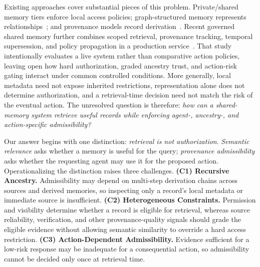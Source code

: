 \documentclass[letterpaper]{article} %
\begin{document}
Existing approaches cover substantial pieces of this problem. Private/shared memory tiers enforce local access policies; graph-structured memory represents relationships~\cite{edge2024graphrag,guo2025lightrag,gutierrez2024hipporag}; and provenance models record  derivation~\cite{belhajjame2013provdm,moreau2013prov}. Recent governed shared memory further combines scoped retrieval, provenance tracking, temporal supersession, and policy propagation in a production service~\cite{margalit2026governed}. That study intentionally evaluates a live system rather than comparative action policies, leaving open how hard authorization, graded ancestry trust, and action-risk gating interact under common controlled conditions. More generally, local metadata need not expose inherited restrictions, representation alone does not determine authorization, and a retrieval-time decision need not match the risk of the eventual action. The unresolved question is therefore: \emph{how can a shared-memory system retrieve useful records while enforcing agent-, ancestry-, and action-specific admissibility?}


Our answer begins with one distinction: \emph{retrieval is not authorization}. \emph{Semantic relevance} asks whether a memory is useful for the query; \emph{provenance admissibility} asks whether the requesting agent may use it for the proposed action. 
Operationalizing the distinction raises three challenges.
\textbf{(C1) Recursive Ancestry.} 
Admissibility may depend on multi-step derivation chains across sources and derived memories, so inspecting only a record's local metadata or immediate source is insufficient.
\textbf{(C2) Heterogeneous Constraints.} 
Permission and visibility determine whether a record is eligible for retrieval, whereas source reliability, verification, and other provenance-quality signals should grade the eligible evidence without allowing semantic similarity to override a hard access restriction. 
\textbf{(C3) Action-Dependent Admissibility.} 
Evidence sufficient for a low-risk response may be inadequate for a consequential action, so admissibility cannot be decided only once at retrieval time.
\end{document}
